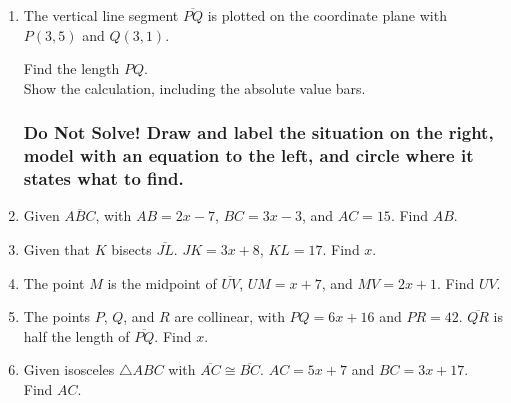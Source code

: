 \begin{enumerate}
\item The vertical line segment $\overline{PQ}$ is plotted on the coordinate plane with $P(3,5)$ and $Q(3,1)$. 
\begin{multicols}{2}
  Find the length $PQ$. \\[0.5cm]
  Show the calculation, including the absolute value bars.
    \begin{flushright}
    \end{flushright}
\end{multicols}
  
\newpage
\subsubsection*{Do Not Solve! Draw and label the situation on the right, model with an equation to the left, and circle where it states what to find.}
  \vspace{0.5cm}

\item Given $\overline{ABC}$, with $AB=2x-7$, $BC=3x-3$, and $AC=15$. Find ${AB}$.
\item Given that $K$ bisects $\overline{JL}$. $JK=3x+8$, $KL=17$. Find ${x}$.
\item The point $M$ is the midpoint of $\overline{UV}$, $UM=x+7$, and $MV=2x+1$. Find ${UV}$.
\item The points $P$, $Q$, and $R$ are collinear, with $PQ=6x+16$ and $PR=42$. $\overline{QR}$ is half the length of $\overline{PQ}$. Find ${x}$.

\newpage
\item Given isosceles $\triangle ABC$ with $\overline{AC} \cong \overline{BC}$. $AC=5x+7$ and $BC=3x+17$. \\ Find $AC$.\\[0.5cm]
  

\end{enumerate}
